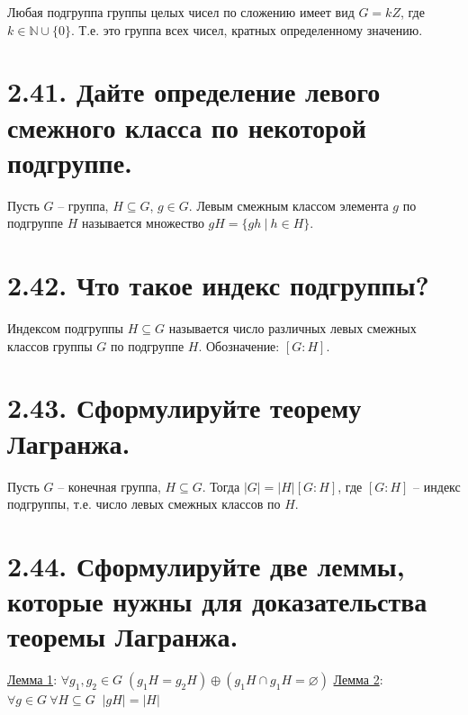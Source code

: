 \documentclass{article}
\begin{document}
Любая подгруппа группы целых чисел по сложению имеет вид $G = kZ$, где $k \in \mathbb{N}\cup\{0\}$. Т.е. это группа всех чисел, кратных определенному значению.

\section*{\LARGE 2.41. Дайте определение левого смежного класса по некоторой подгруппе. }

Пусть $G$ -- группа, $H \subseteq G$, $g \in G$. Левым смежным классом элемента $g$ по подгруппе $H$ называется множество $gH = \{gh \:|\: h \in H\}$.

\section*{\LARGE 2.42. Что такое индекс подгруппы? }

Индексом подгруппы $H \subseteq G$ называется число различных левых смежных классов группы $G$ по подгруппе $H$. Обозначение: $[G : H]$.

\section*{\LARGE 2.43. Сформулируйте теорему Лагранжа. }

Пусть $G$ -- конечная группа, $H \subseteq G$. Тогда $|G| = |H|[G : H]$, где $[G : H]$ -- индекс подгруппы, т.е. число левых смежных классов по $H$.

\section*{\LARGE 2.44. Сформулируйте две леммы, которые нужны для доказательства теоремы Лагранжа. }

\underline{Лемма 1}:
\newline $\forall g_1, g_2 \in G \; (g_1H = g_2H) \oplus (g_1H \cap g_1H = \varnothing)$
\newline \underline{Лемма 2}:
\newline $\forall g \in G \: \forall H \subseteq G \;\; |gH| = |H|$
\end{document}

